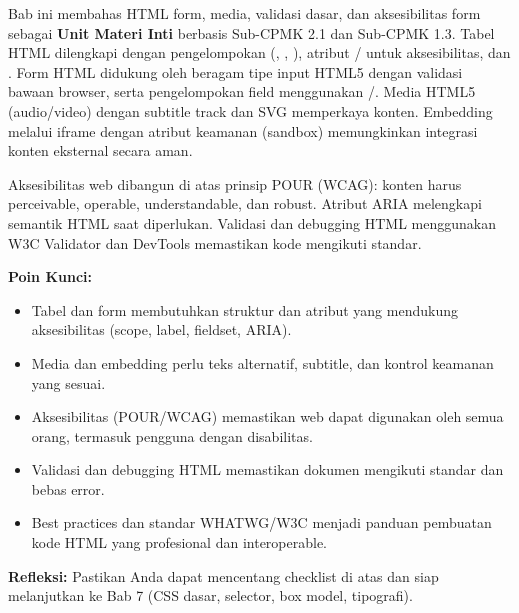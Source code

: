 \documentclass[../main.tex]{subfiles}
\begin{document}
\begin{rangkuman}
Bab ini membahas HTML form, media, validasi dasar, dan aksesibilitas form sebagai \textbf{Unit Materi Inti} berbasis Sub-CPMK 2.1 dan Sub-CPMK 1.3. Tabel HTML dilengkapi dengan pengelompokan (, , ), atribut / untuk aksesibilitas, dan . Form HTML didukung oleh beragam tipe input HTML5 dengan validasi bawaan browser, serta pengelompokan field menggunakan /. Media HTML5 (audio/video) dengan subtitle track dan SVG memperkaya konten. Embedding melalui iframe dengan atribut keamanan (sandbox) memungkinkan integrasi konten eksternal secara aman.

Aksesibilitas web dibangun di atas prinsip POUR (WCAG): konten harus perceivable, operable, understandable, dan robust. Atribut ARIA melengkapi semantik HTML saat diperlukan. Validasi dan debugging HTML menggunakan W3C Validator dan DevTools memastikan kode mengikuti standar.

\textbf{Poin Kunci:}
\begin{itemize}
  \item Tabel dan form membutuhkan struktur dan atribut yang mendukung aksesibilitas (scope, label, fieldset, ARIA).
  \item Media dan embedding perlu teks alternatif, subtitle, dan kontrol keamanan yang sesuai.
  \item Aksesibilitas (POUR/WCAG) memastikan web dapat digunakan oleh semua orang, termasuk pengguna dengan disabilitas.
  \item Validasi dan debugging HTML memastikan dokumen mengikuti standar dan bebas error.
  \item Best practices dan standar WHATWG/W3C menjadi panduan pembuatan kode HTML yang profesional dan interoperable.
\end{itemize}

\textbf{Refleksi:} Pastikan Anda dapat mencentang checklist di atas dan siap melanjutkan ke Bab 7 (CSS dasar, selector, box model, tipografi).
\end{rangkuman}

\ifSubfilesClassLoaded{
  \renewcommand{\bibname}{Daftar Pustaka}
  
  
}{}
\end{document}
